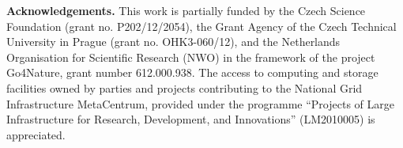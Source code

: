 
{\bf Acknowledgements.} This work is partially funded by the Czech Science Foundation (grant no. P202/12/2054), the Grant
Agency of the Czech Technical University in Prague (grant no. OHK3-060/12), and the Netherlands
Organisation for Scientific Research (NWO) in the framework of the project Go4Nature, grant number 612.000.938. 
The access to computing and storage facilities owned by parties and projects contributing to the National Grid 
Infrastructure MetaCentrum, provided under the 
programme ``Projects of Large Infrastructure for Research, Development, and Innovations'' (LM2010005) is appreciated.

